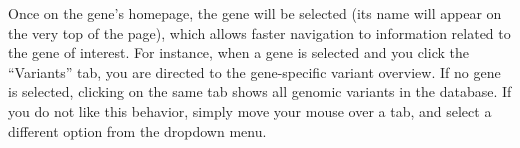 Once on the gene's homepage, the gene will be selected (its name will appear on the very top of the page),
 which allows faster navigation to information related to the gene of interest.
For instance, when a gene is selected and you click the ``Variants'' tab, you are directed to the gene-specific variant overview.
If no gene is selected, clicking on the same tab shows all genomic variants in the database.
If you do not like this behavior, simply move your mouse over a tab, and select a different option from the dropdown menu.
%
